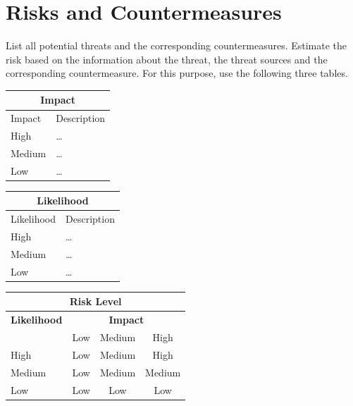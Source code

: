 \documentclass[a4paper, toc=index, 12pt, DIV14, twoside, BCOR2cm, headsepline, numbers=noenddot, bibliography=totoc]{scrbook}
\begin{document}
\section{Risks and Countermeasures}

List all potential threats and the
  corresponding countermeasures. Estimate the risk based on 
  the information about the threat, the threat sources and the 
  corresponding countermeasure. For this purpose, use the following three
  tables.


\begin{center}
\begin{tabular}{|l|l|}
\hline
\multicolumn{2}{|c|}{\bf Impact} \\
\hline
Impact & Description \\
\hline
\hline
High   & \hspace*{20pt}\ldots \\
\hline
Medium & \hspace*{20pt}\ldots \\
\hline
Low   & \hspace*{20pt}\ldots \\
\hline
\end{tabular}
%
%
\begin{tabular}{|l|l|}
\hline
\multicolumn{2}{|c|}{\bf Likelihood} \\
\hline
Likelihood & Description \\
\hline
\hline
High   & \hspace*{20pt}\ldots \\
\hline
Medium & \hspace*{20pt}\ldots \\
\hline
Low   & \hspace*{20pt}\ldots \\
\hline
\end{tabular}
\end{center}

\vspace{5mm}

\begin{center}
\begin{tabular}{|l|c|c|c|}
\hline
\multicolumn{4}{|c|}{{\bf Risk Level}} \\
\hline
{{\bf Likelihood}} & \multicolumn{3}{c|}{{\bf Impact}} \\ %
     & Low & Medium & High \\  \hline
 High & Low & Medium & High  \\
\hline
 Medium & Low & Medium & Medium \\
\hline
 Low & Low & Low & Low \\
\hline
\end{tabular}
\end{center}
\end{document}
